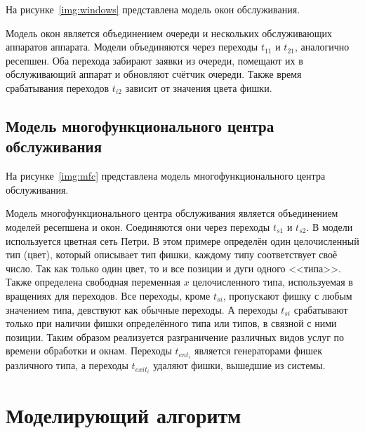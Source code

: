 На рисунке~\ref{img:windows} представлена модель окон обслуживания.

\FloatBarrier

Модель окон является объединением очереди и нескольких обслуживающих аппаратов аппарата. Модели объединяются через переходы $t_{11}$ и $t_{21}$, аналогично ресепшен. Оба перехода забирают заявки из очереди, помещают их в обслуживающий аппарат и обновляют счётчик очереди. Также время срабатывания переходов $t_{i2}$ зависит от значения цвета фишки.

\subsection{Модель многофункционального центра обслуживания}

На рисунке~\ref{img:mfc} представлена модель многофункционального центра обслуживания.

\FloatBarrier

Модель многофункционального центра обслуживания является объединением моделей ресепшена и окон. Соединяются они через переходы $t_{s1}$ и $t_{s2}$. В модели используется цветная сеть Петри. В этом примере определён один целочисленный тип (цвет), который описывает тип фишки, каждому типу соответствует своё число. Так как только один цвет, то и все позиции и дуги одного <<типа>>. Также определена свободная переменная $x$ целочисленного типа, используемая в вращениях для переходов. Все переходы, кроме $t_{si}$, пропускают фишку с любым значением типа, девствуют как обычные переходы. А переходы $t_{si}$ срабатывают только при наличии фишки определённого типа или типов, в связной с ними позиции. Таким образом реализуется разграничение различных видов услуг по времени обработки и окнам. Переходы $t_{ent_i}$ является генераторами фишек различного типа, а переходы $t_{exit_i}$ удаляют фишки, вышедшие из системы. 

\clearpage

\section{Моделирующий алгоритм}

